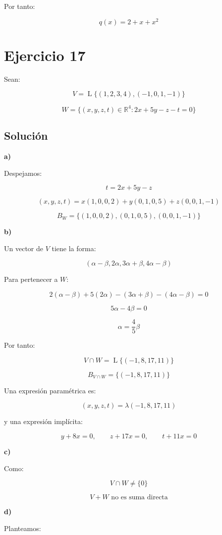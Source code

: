 \documentclass[11pt,a4paper]{article}
\newcommand{\R}{\mathbb{R}}
\newcommand{\Span}{\operatorname{L}}
\begin{document}
	Por tanto:

	\[
	\boxed{
	q(x)=2+x+x^2
	}
	\]

\section{Ejercicio 17}
	Sean:

	\[
	V=
	\Span\{(1,2,3,4),(-1,0,1,-1)\}
	\]

	\[
	W=
	\{(x,y,z,t)\in\R^4:2x+5y-z-t=0\}
	\]

	\subsection{Solución}

	\textbf{a)}

	Despejamos:

	\[
	t=2x+5y-z
	\]

	\[
	(x,y,z,t)
	=
	x(1,0,0,2)
	+y(0,1,0,5)
	+z(0,0,1,-1)
	\]

	\[
	\boxed{
	B_W=
	\{(1,0,0,2),(0,1,0,5),(0,0,1,-1)\}
	}
	\]

	\textbf{b)}

	Un vector de $V$ tiene la forma:

	\[
	(\alpha-\beta,2\alpha,3\alpha+\beta,4\alpha-\beta)
	\]

	Para pertenecer a $W$:

	\[
	2(\alpha-\beta)
	+
	5(2\alpha)
	-
	(3\alpha+\beta)
	-
	(4\alpha-\beta)
	=
	0
	\]

	\[
	5\alpha-4\beta=0
	\]

	\[
	\alpha=\frac45\beta
	\]

	Por tanto:

	\[
	V\cap W
	=
	\Span\{(-1,8,17,11)\}
	\]

	\[
	\boxed{
	B_{V\cap W}
	=
	\{(-1,8,17,11)\}
	}
	\]

	Una expresión paramétrica es:

	\[
	\boxed{
	(x,y,z,t)
	=
	\lambda(-1,8,17,11)
	}
	\]

	y una expresión implícita:

	\[
	\boxed{
	y+8x=0,
	\qquad
	z+17x=0,
	\qquad
	t+11x=0
	}
	\]

	\textbf{c)}

	Como:

	\[
	V\cap W\neq\{0\}
	\]

	\[
	\boxed{
	V+W\text{ no es suma directa}
	}
	\]

	\textbf{d)}

	Planteamos:
\end{document}
